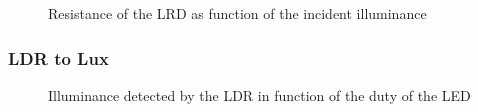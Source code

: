 \begin{figure}[h]
    \centering
    \resizebox{\textwidth}{!}{}
    \caption{Resistance of the LRD as function of the incident illuminance}
    \label{fig:LDR_model}
\end{figure}

\subsubsection{LDR to Lux}
\label{sub:LDRtoLux}

\begin{figure}[h]
    \centering
    \resizebox{\textwidth}{!}{}
    \caption{Illuminance detected by the LDR in function of the duty of the LED}
    \label{fig:pwm_to_lux}
\end{figure}

